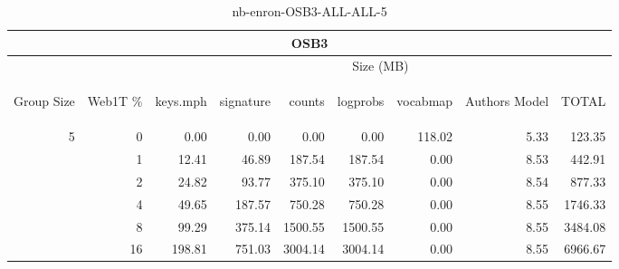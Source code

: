 \begin{center}
\begin{table}[htbp]
\begin{tabular}{ | r | r | r | r | r | r | r | r | r |}
\hline
\multicolumn{9}{|c|}{OSB3}\\
\hline
 & & \multicolumn{7}{|c|}{Size (MB)}\\ \cline{3-9}
\begin{sideways}Group Size\end{sideways} & \begin{sideways}Web1T \% \end{sideways} & \begin{sideways}keys.mph\end{sideways} & \begin{sideways}signature\end{sideways} & \begin{sideways}counts\end{sideways} & \begin{sideways}logprobs\end{sideways} & \begin{sideways}vocabmap\end{sideways} & \begin{sideways}Authors Model \end{sideways} & \begin{sideways}TOTAL\end{sideways}\\
\hline
\multirow{5}{*}{5}
 & 0 & 0.00 & 0.00 & 0.00 & 0.00 & 118.02 & 5.33 & 123.35\\ \cline{2-9}
 & 1 & 12.41 & 46.89 & 187.54 & 187.54 & 0.00 & 8.53 & 442.91\\ \cline{2-9}
 & 2 & 24.82 & 93.77 & 375.10 & 375.10 & 0.00 & 8.54 & 877.33\\ \cline{2-9}
 & 4 & 49.65 & 187.57 & 750.28 & 750.28 & 0.00 & 8.55 & 1746.33\\ \cline{2-9}
 & 8 & 99.29 & 375.14 & 1500.55 & 1500.55 & 0.00 & 8.55 & 3484.08\\ \cline{2-9}
 & 16 & 198.81 & 751.03 & 3004.14 & 3004.14 & 0.00 & 8.55 & 6966.67\\ \cline{2-9}
\hline
\end{tabular}
\caption{nb-enron-OSB3-ALL-ALL-5}
\label{table:nb-enron-OSB3-ALL-ALL-5}
\end{table}
\end{center}

